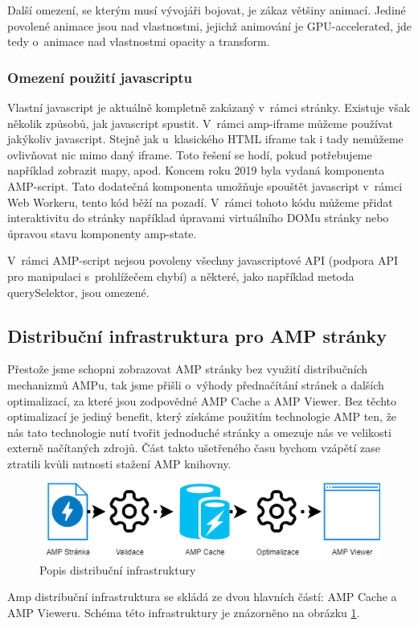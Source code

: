 Další omezení, se kterým musí vývojáři bojovat, je zákaz většiny animací. Jediné povolené animace jsou nad vlastnostmi, jejichž animování je GPU-accelerated, jde tedy o~animace nad vlastnostmi opacity a transform\cite{AMPCss}.

\subsubsection*{Omezení použití javascriptu}
Vlastní javascript je aktuálně kompletně zakázaný v~rámci stránky. Existuje však několik způsobů, jak javascript spustit.
V~rámci amp-iframe můžeme používat jakýkoliv javascript. Stejně jak u~klasického HTML iframe tak i tady nemůžeme ovlivňovat nic mimo daný iframe. Toto řešení se hodí, pokud potřebujeme například zobrazit mapy, apod.
Koncem roku 2019 byla vydaná komponenta AMP-script. Tato dodatečná komponenta umožňuje spouštět javascript v~rámci Web Workeru, tento kód běží na pozadí. V~rámci tohoto kódu můžeme přidat interaktivitu do stránky například úpravami virtuálního DOMu stránky nebo úpravou stavu komponenty amp-state.

V~rámci AMP-script nejsou povoleny všechny javascriptové API (podpora API pro manipulaci s~prohlížečem chybí) a některé, jako například metoda querySelektor, jsou omezené\cite{amp-script}.

\subsection*{Distribuční infrastruktura pro AMP stránky}

Přestože jsme schopni zobrazovat AMP stránky bez využití distribučních mechanizmů AMPu, tak jsme přišli o~výhody přednačítání stránek a dalších optimalizací, za které jsou zodpovědné AMP Cache a AMP Viewer.
Bez těchto optimalizací je jediný benefit, který získáme použitím technologie AMP ten, že nás tato technologie nutí tvořit jednoduché stránky a omezuje nás ve velikosti externě načítaných zdrojů. Část takto ušetřeného času bychom vzápětí zase ztratili kvůli nutnosti stažení AMP knihovny.

\begin{figure}[hbt]
	\centering
	\includegraphics[width=1\textwidth]{obrazky-figures/AmpDistribuce.png}
	\caption{Popis distribuční infrastruktury}
	\label{Popis Distribuční infrastruktury AMP}
\end{figure}
Amp distribuční infrastruktura se skládá ze dvou hlavních částí: AMP Cache a AMP Vieweru. Schéma této infrastruktury je znázorněno na obrázku \ref{Popis Distribuční infrastruktury AMP}.

